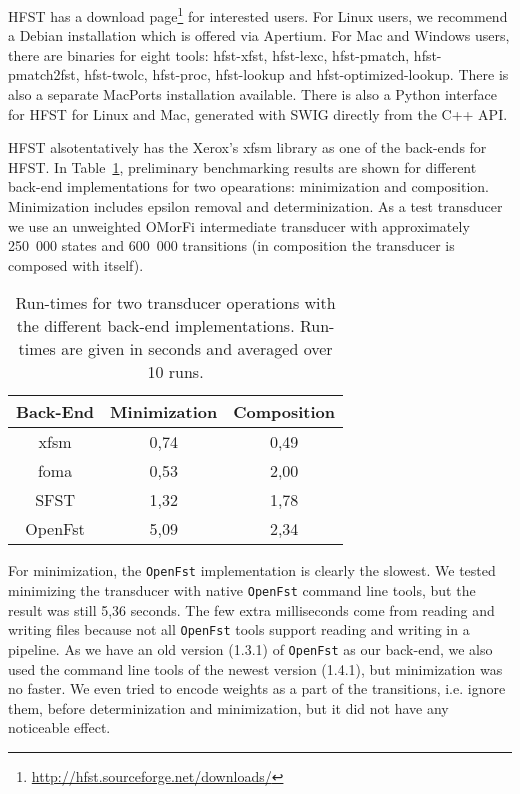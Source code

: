\documentclass{llncs}
\begin{document}
HFST has a download page\footnote{\url{http://hfst.sourceforge.net/downloads/}} for interested users. 
For Linux users, we recommend a Debian installation
which is offered via Apertium. For Mac and Windows users,
there are binaries for eight tools: hfst-xfst, hfst-lexc, hfst-pmatch,
hfst-pmatch2fst, hfst-twolc, hfst-proc, hfst-lookup and hfst-optimized-lookup.
There is also a separate MacPorts installation available. 
There is also a Python interface for HFST for Linux and Mac, generated with SWIG directly
from the C++ API. 

 HFST alsotentatively has the Xerox's xfsm library as one of the back-ends for HFST.
In Table~\ref{operationtimes}, preliminary benchmarking results are shown for different back-end
implementations for two opearations: minimization and composition. Minimization includes epsilon
removal and determinization. As a test transducer we use an 
unweighted OMorFi intermediate transducer with approximately 250~000 states and 600~000 transitions (in composition
the transducer is composed with itself).

\begin{table}[h!]
  \centering
  \caption{Run-times for two transducer operations with the different back-end implementations.
    Run-times are given in seconds and averaged over 10 runs.}
  \begin{tabular}{c c c }
    \hline
    Back-End & Minimization & Composition \\ \hline
    xfsm & 0,74 & 0,49 \\
    foma & 0,53 & 2,00 \\
    SFST & 1,32 & 1,78 \\
    OpenFst & 5,09 & 2,34 \\ \hline
  \end{tabular}
  \label{operationtimes}
\end{table}

For minimization, the {\tt OpenFst} implementation is clearly the slowest. We tested minimizing
the transducer with native {\tt OpenFst} command line tools, but the result was still 5,36 seconds.
The few extra milliseconds come from reading and writing files because not all {\tt OpenFst} tools support reading
and writing in a pipeline. As we have an old version (1.3.1) of {\tt OpenFst} as our back-end, we also
used the command line tools of the newest version (1.4.1), but minimization was no faster.
We even tried to encode weights as a part of the transitions, i.e. ignore them, before determinization
and minimization, but it did not have any noticeable effect.
\end{document}
